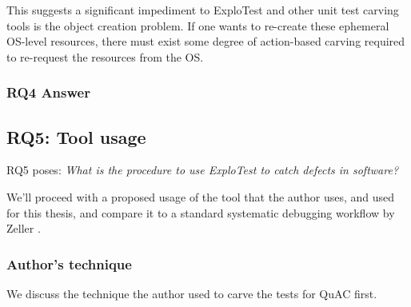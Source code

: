 This suggests a significant impediment to ExploTest and other unit test carving tools is the object creation problem. If one wants to re-create these ephemeral
OS-level resources, there must exist some degree of action-based carving required to re-request the resources from the OS.

\subsubsection{RQ4 Answer}
\noindent{}

\subsection{RQ5: Tool usage}
RQ5 poses: \textit{What is the procedure to use ExploTest to catch defects in software?}

We'll proceed with a proposed usage of the tool that the author uses, and used for this thesis, and compare
it to a standard systematic debugging workflow by Zeller \cite{zeller2009programs}.

\subsubsection{Author's technique}
We discuss the technique the author used to carve the tests for QuAC first.

